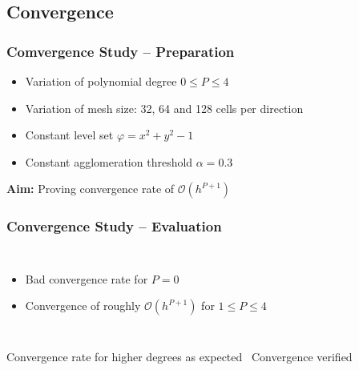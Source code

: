 	\subsection{Convergence}
	\begin{frame}
		\frametitle{Comvergence Study -- Preparation}
		\begin{itemize}
			\item Variation of polynomial degree $ 0 \leq P \leq 4$
			\item Variation of mesh size: 32, 64 and 128 cells per direction
			\item Constant level set $\varphi  = x^2 + y^2 -1$
			\item Constant agglomeration threshold $\alpha = 0.3$
		\end{itemize}
		\vspace{0.5cm}
		\begin{center}
			\large
			\textbf{Aim:} Proving convergence rate of $\mathcal{O}(h^{P+1})$
		\end{center}
	\end{frame}
	\begin{frame}
		\frametitle{Convergence Study -- Evaluation}
		\begin{columns}[t]
			\column[]{4cm}
			\begin{itemize}
				\item Bad convergence rate for $P=0$
				\item Convergence of roughly $\mathcal{O}(h^{P+1})$ for $ 1 \leq P \leq 4$
			\end{itemize}
			\column[]{8cm}
		\begin{figure}[htp]
			\vspace{-1cm}
			\centering		
			
		\end{figure}
		\end{columns}
			\begin{center}
				\large
				Convergence rate for higher degrees as expected \newline \MVRightarrow \, Convergence verified
			\end{center}
	\end{frame}